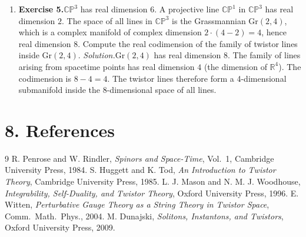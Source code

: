 \begin{enumerate}[leftmargin=*,itemsep=0.9em]
\item \textbf{Exercise 5.}$\mathbb{CP}^3$ has real dimension $6$. A projective line $\mathbb{CP}^1$ in $\mathbb{CP}^3$ has real dimension $2$. The space of all lines in $\mathbb{CP}^3$ is the Grassmannian $\mathrm{Gr}(2,4)$, which is a complex manifold of complex dimension $2 \cdot (4-2) = 4$, hence real dimension $8$. Compute the real codimension of the family of twistor lines inside $\mathrm{Gr}(2,4)$. \emph{Solution.}$\mathrm{Gr}(2,4)$ has real dimension $8$. The family of lines arising from spacetime points has real dimension $4$ (the dimension of $\mathbb{R}^4$). The codimension is $8 - 4 = 4$. The twistor lines therefore form a 4-dimensional submanifold inside the 8-dimensional space of all lines.

\end{enumerate}
\section*{8. References}
\begin{thebibliography}{9}
 R. Penrose and W. Rindler, \emph{Spinors and Space-Time}, Vol.~1, Cambridge University Press, 1984.
 S. Huggett and K. Tod, \emph{An Introduction to Twistor Theory}, Cambridge University Press, 1985.
 L. J. Mason and N. M. J. Woodhouse, \emph{Integrability, Self-Duality, and Twistor Theory}, Oxford University Press, 1996.
 E. Witten, \emph{Perturbative Gauge Theory as a String Theory in Twistor Space}, Comm.\ Math.\ Phys., 2004.
 M. Dunajski, \emph{Solitons, Instantons, and Twistors}, Oxford University Press, 2009.
\end{thebibliography}
